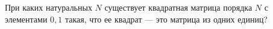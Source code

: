 \documentclass{article}
\begin{document}
При каких натуральных $N$ существует квадратная матрица порядка $N$ с элементами $0,1$ такая, что 
ее квадрат --- это матрица из одних единиц?
\end{document}
